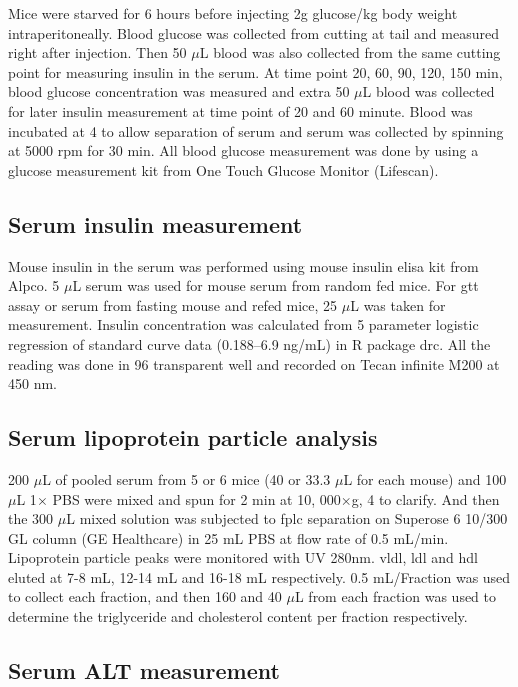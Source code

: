Mice were starved for 6 hours before injecting 2g glucose/kg body weight intraperitoneally. Blood glucose was collected from cutting at tail and measured right after injection. Then 50 $\mu$L blood was also collected from the same cutting point for measuring insulin in the serum. At time point 20, 60, 90, 120, 150 min, blood glucose concentration was measured and extra 50 $\mu$L blood was collected for later insulin measurement at time point of 20 and 60 minute. Blood was incubated at 4 \celsius{} to allow separation of serum and serum was collected by spinning at 5000 rpm for 30 min. All blood glucose measurement was done by using a glucose measurement kit from One Touch Glucose Monitor (Lifescan).

\subsection{Serum insulin measurement}

Mouse insulin in the serum was performed using mouse insulin \gls{elisa} kit from Alpco. 5 $\mu$L serum was used for mouse serum from random fed mice. For \gls{gtt} assay or serum from fasting mouse and refed mice, 25 $\mu$L was taken for measurement. Insulin concentration was calculated from 5 parameter logistic regression of standard curve data (0.188--6.9 ng/mL) in R package drc. All the reading was done in 96 transparent well and recorded on Tecan infinite M200 at 450 nm.

\subsection{Serum lipoprotein particle analysis}

200 $\mu$L of pooled serum from 5 or 6 mice (40 or 33.3 $\mu$L for each mouse) and 100 $\mu$L 1$\times$ PBS were mixed and spun for 2 min at 10, 000$\times$g, 4 \celsius{} to clarify. And then the 300 $\mu$L mixed solution was subjected to \gls{fplc} separation on Superose\textsuperscript{\texttrademark} 6 10/300 GL column (GE Healthcare) in 25 mL PBS at flow rate of 0.5 mL/min. Lipoprotein particle peaks were monitored with UV 280nm. \gls{vldl}, \gls{ldl} and \gls{hdl} eluted at 7-8 mL, 12-14 mL and 16-18 mL respectively. 0.5 mL/Fraction was used to collect each fraction, and then 160 and 40 $\mu$L from each fraction was used to determine the triglyceride and cholesterol content per fraction respectively.

\subsection{Serum ALT measurement}


